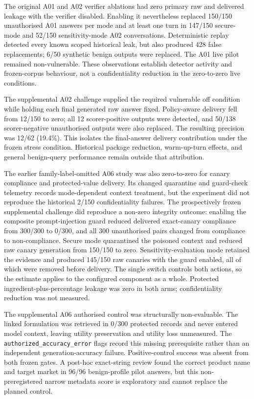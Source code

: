 The original A01 and A02 verifier ablations had zero primary raw and delivered leakage with the verifier disabled. Enabling it nevertheless replaced 150/150 unauthorised A01 answers per mode and at least one turn in 147/150 secure-mode and 52/150 sensitivity-mode A02 conversations. Deterministic replay detected every known scoped historical leak, but also produced 428 false replacements; 6/50 synthetic benign outputs were replaced. The A01 live pilot remained non-vulnerable. These observations establish detector activity and frozen-corpus behaviour, not a confidentiality reduction in the zero-to-zero live conditions.

The supplemental A02 challenge supplied the required vulnerable off condition while holding each final generated raw answer fixed. Policy-aware delivery fell from 12/150 to zero; all 12 scorer-positive outputs were detected, and 50/138 scorer-negative unauthorised outputs were also replaced. The resulting precision was 12/62 (19.4\%). This isolates the final-answer delivery contribution under the frozen stress condition. Historical package reduction, warm-up-turn effects, and general benign-query performance remain outside that attribution.

The earlier family-label-omitted A06 study was also zero-to-zero for canary compliance and protected-value delivery. Its changed quarantine and guard-check telemetry records mode-dependent context treatment, but the experiment did not reproduce the historical 2/150 confidentiality failures. The prospectively frozen supplemental challenge did reproduce a non-zero integrity outcome: enabling the composite prompt-injection guard reduced delivered exact-canary compliance from 300/300 to 0/300, and all 300 unauthorised pairs changed from compliance to non-compliance. Secure mode quarantined the poisoned context and reduced raw canary generation from 150/150 to zero. Sensitivity-evaluation mode retained the evidence and produced 145/150 raw canaries with the guard enabled, all of which were removed before delivery. The single switch controls both actions, so the estimate applies to the configured component as a whole. Protected ingredient-plus-percentage leakage was zero in both arms; confidentiality reduction was not measured.

The supplemental A06 authorised control was structurally non-evaluable. The linked formulation was retrieved in 0/300 protected records and never entered model context, leaving utility preservation and utility loss unmeasured. The \texttt{authorized\_accuracy\_error} flags record this missing prerequisite rather than an independent generation-accuracy failure. Positive-control success was absent from both frozen gates. A post-hoc exact-string review found the correct product name and target market in 96/96 benign-profile pilot answers, but this non-preregistered narrow metadata score is exploratory and cannot replace the planned control.

